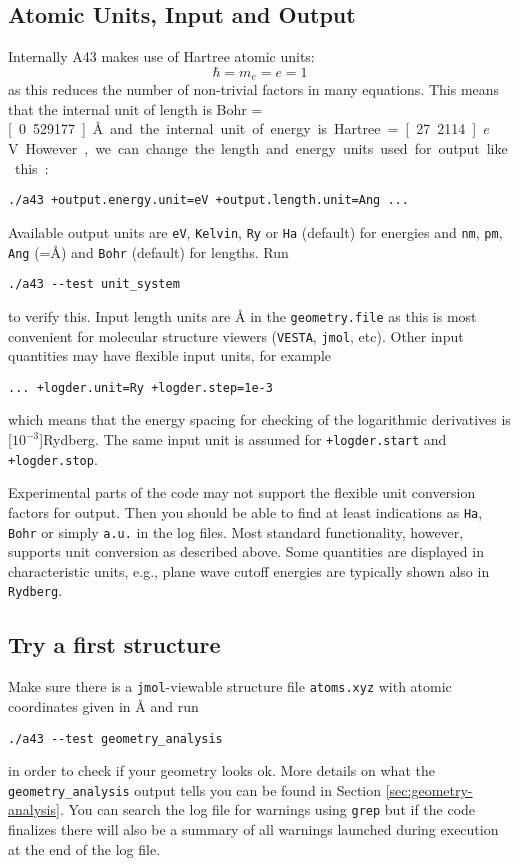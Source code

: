 \documentclass[oribibl]{llncs}
\newcommand{\ttt}[1]{\texttt{#1}}
\newcommand{\codename}{A43}
\begin{document}
\subsection{Atomic Units, Input and Output} \label{sec:units}
%
Internally \codename{} makes use of Hartree atomic units:
\begin{equation}
	\hbar = m_e = e = 1
\end{equation}
as this reduces the number of non-trivial factors in many equations.
This means that the internal unit of length is Bohr = \unit[0.529177]{\AA{}}
and the internal unit of energy is Hartree = \unit[27.2114]{$e$V}.
However, we can change the length and energy units used for output like this:
\begin{verbatim}
./a43 +output.energy.unit=eV +output.length.unit=Ang ...
\end{verbatim}
Available output units are \ttt{eV}, \ttt{Kelvin}, \ttt{Ry} or \ttt{Ha} (default) for energies 
and \ttt{nm}, \ttt{pm}, \ttt{Ang} (=\AA) and \ttt{Bohr} (default) for lengths. Run
\begin{verbatim}
./a43 --test unit_system
\end{verbatim}
to verify this.
%
Input length units are \AA{} in the \ttt{geometry.file} as this is most convenient for molecular structure viewers
(\ttt{VESTA}, \ttt{jmol}, etc). Other input quantities may have flexible input units, for example
\begin{verbatim}
... +logder.unit=Ry +logder.step=1e-3
\end{verbatim}
which means that the energy spacing for checking of the logarithmic derivatives is \unit[$10^{-3}$]{Rydberg}.
The same input unit is assumed for \ttt{+logder.start} and \ttt{+logder.stop}.

\noindent
Experimental parts of the code may not support the flexible unit conversion
factors for output. Then you should be able to find at least indications as \ttt{Ha}, \ttt{Bohr} or simply \ttt{a.u.} in the log files.
Most standard functionality, however, supports unit conversion as described above.
Some quantities are displayed in characteristic units, e.g., plane wave cutoff energies are typically shown also in \ttt{Rydberg}.


\subsection{Try a first structure} \label{sec:first-steps}
%
Make sure there is a \ttt{jmol}-viewable structure file \ttt{atoms.xyz}
with atomic coordinates given in \AA{} and run
\begin{verbatim}
./a43 --test geometry_analysis
\end{verbatim}
in order to check if your geometry looks ok.
More details on what the \ttt{geometry\_analysis} output tells you can be found in Section \ref{sec:geometry-analysis}.
You can search the log file for warnings using \ttt{grep} but
if the code finalizes
there will also be a summary of all warnings launched during execution at the end of the log file.
%
\end{document}
